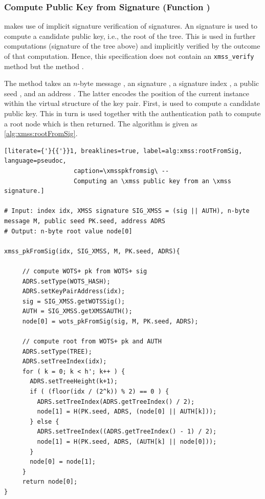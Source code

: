 \subsubsection{\xmss Compute Public Key from Signature (Function \xmsspkfromsig)}

   \spx makes use of implicit signature verification of \xmss signatures. 
   An \xmss signature is used to compute a candidate \xmss public key, i.e., the 
   root of the tree. This is used in further computations (signature of the tree above) 
   and implicitly verified by the outcome of that computation. Hence, this 
   specification does not contain an \texttt{xmss\_verify} method but the method 
   \xmsspkfromsig. 
   
   The method \xmsspkfromsig takes an $n$-byte message \msg, 
   an \xmss signature \xmsssig, a signature index \idx, a public seed \pseed, and 
   an address \adrs. The latter encodes the position of the current \xmss 
   instance within the virtual structure of the \spx key pair. First, 
   \wotspkfromsig is used to compute a candidate \wotsp public key. This in
   turn is used together with the authentication path to compute a root node
   which is then returned. The algorithm \xmsspkfromsig is given 
   as \autoref{alg:xmss:rootFromSig}.
   
   
   
\begin{lstlisting}[literate={'}{{'}}1, breaklines=true, label=alg:xmss:rootFromSig, language=pseudoc,
                   caption=\xmsspkfromsig\ -- 
                   Computing an \xmss public key from an \xmss signature.]

# Input: index idx, XMSS signature SIG_XMSS = (sig || AUTH), n-byte message M, public seed PK.seed, address ADRS
# Output: n-byte root value node[0]

xmss_pkFromSig(idx, SIG_XMSS, M, PK.seed, ADRS){
     
     // compute WOTS+ pk from WOTS+ sig
     ADRS.setType(WOTS_HASH);
     ADRS.setKeyPairAddress(idx);
     sig = SIG_XMSS.getWOTSSig();
     AUTH = SIG_XMSS.getXMSSAUTH();
     node[0] = wots_pkFromSig(sig, M, PK.seed, ADRS);
     
     // compute root from WOTS+ pk and AUTH
     ADRS.setType(TREE);
     ADRS.setTreeIndex(idx);
     for ( k = 0; k < h'; k++ ) {
       ADRS.setTreeHeight(k+1);
       if ( (floor(idx / (2^k)) % 2) == 0 ) {
         ADRS.setTreeIndex(ADRS.getTreeIndex() / 2);
         node[1] = H(PK.seed, ADRS, (node[0] || AUTH[k]));
       } else {
         ADRS.setTreeIndex((ADRS.getTreeIndex() - 1) / 2);
         node[1] = H(PK.seed, ADRS, (AUTH[k] || node[0]));
       }
       node[0] = node[1];
     }
     return node[0];
}
\end{lstlisting}

